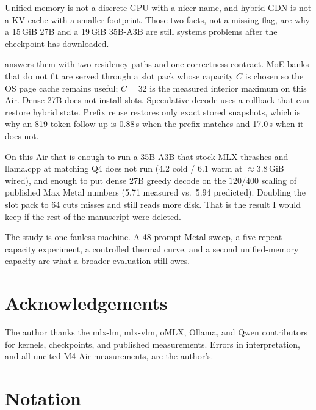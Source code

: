 Unified memory is not a discrete GPU with a nicer name, and hybrid GDN is not a KV cache with a smaller footprint. Those two facts, not a missing flag, are why a 15\,GiB 27B and a 19\,GiB 35B-A3B are still systems problems after the checkpoint has downloaded.

\slotbank{} answers them with two residency paths and one correctness contract. MoE banks that do not fit are served through a slot pack whose capacity $C$ is chosen so the OS page cache remains useful; $C{=}32$ is the measured interior maximum on this Air. Dense 27B does not install slots. Speculative decode uses a rollback that can restore hybrid state. Prefix reuse restores only exact stored snapshots, which is why an 819-token follow-up is 0.88\,s when the prefix matches and 17.0\,s when it does not.

On this Air that is enough to run a 35B-A3B that stock MLX thrashes and llama.cpp at matching Q4 does not run (4.2 cold / 6.1 warm at ${\approx}3.8$\,GiB wired), and enough to put dense 27B greedy decode on the $120/400$ scaling of published Max Metal numbers (5.71 measured vs.\ 5.94 predicted). Doubling the slot pack to 64 cuts misses and still reads more disk. That is the result I would keep if the rest of the manuscript were deleted.

The study is one fanless machine. A 48-prompt Metal sweep, a five-repeat capacity experiment, a controlled thermal curve, and a second unified-memory capacity are what a broader evaluation still owes.

\section*{Acknowledgements}

The author thanks the mlx-lm, mlx-vlm, oMLX, Ollama, and Qwen contributors for kernels, checkpoints, and published measurements. Errors in interpretation, and all uncited M4 Air measurements, are the author’s.




\appendix
\section{Notation}
\label{app:notation}

